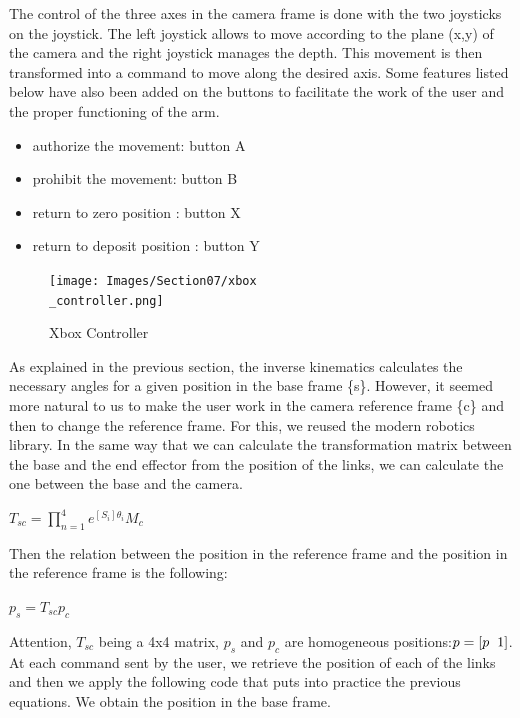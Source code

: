 \bigbreak
The control of the three axes in the camera frame is done with the two joysticks on the joystick. The left joystick allows to move according to the plane (x,y) of the camera and the right joystick manages the depth. This movement is then transformed into a command to move along the desired axis. Some features listed below have also been added on the buttons to facilitate the work of the user and the proper functioning of the arm.
\begin{itemize}[noitemsep]
    \item authorize the movement: button A
    \item prohibit the movement: button B
    \item return to zero position : button X
    \item return to deposit position : button Y
\end{itemize}

\begin{figure}[ht]
    \centering
    \texttt{[image: Images/Section07/xbox\\\_controller.png]}
    \caption{Xbox Controller}
    \label{fig:XboxController}
\end{figure}
\FloatBarrier

\bigbreak
As explained in the previous section, the inverse kinematics calculates the necessary angles for a given position in the base frame \{s\}. However, it seemed more natural to us to make the user work in the camera reference frame \{c\} and then to change the reference frame. For this, we reused the modern robotics library. In the same way that we can calculate the transformation matrix between the base and the end effector from the position of the links, we can calculate the one between the base and the camera. 
\begin{center}
    $T_{sc} =\displaystyle \prod_{n=1}^4e^{[S_i]\theta_i}M_c$
\end{center}

\bigbreak
Then the relation between the position in the reference frame and the position in the reference frame is the following:
\begin{center}
    $p_s = T_{sc}p_c$
\end{center}

\bigbreak
Attention, $T_{sc}$ being a 4x4 matrix, $p_s$ and $p_c$ are homogeneous positions:$p = [p\hspace{0.2cm}1]$. At each command sent by the user, we retrieve the position of each of the links and then we apply the following code that puts into practice the previous equations. We obtain the position in the base frame.

